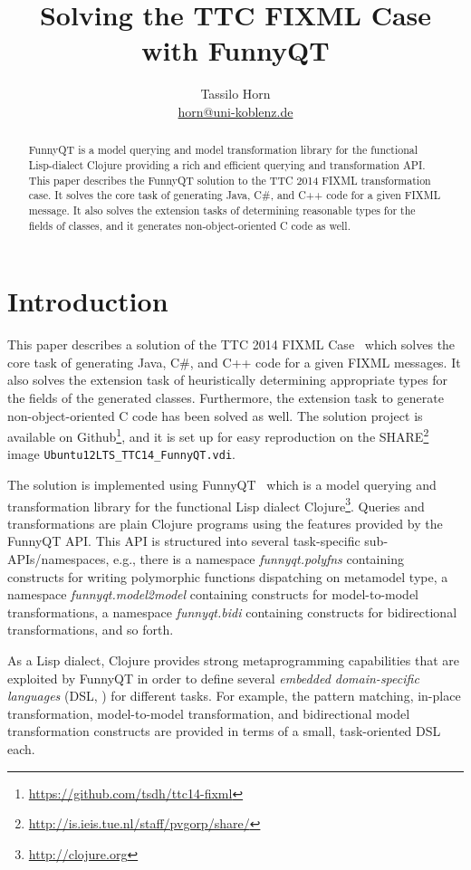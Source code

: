\documentclass[a4paper]{article}
\title{Solving the TTC FIXML Case with FunnyQT}
\author{Tassilo Horn\\
  \href{mailto:horn@uni-koblenz.de}{horn@uni-koblenz.de}}
\begin{document}
\maketitle

\begin{abstract}
  FunnyQT is a model querying and model transformation library for the
  functional Lisp-dialect Clojure providing a rich and efficient querying and
  transformation API.  This paper describes the FunnyQT solution to the TTC
  2014 FIXML transformation case.  It solves the core task of generating Java,
  C\#, and C++ code for a given FIXML message.  It also solves the extension
  tasks of determining reasonable types for the fields of classes, and it
  generates non-object-oriented C code as well.
\end{abstract}


\section{Introduction}
\label{sec:introduction}

This paper describes a solution of the TTC 2014 FIXML
Case~\cite{fixml-case-desc} which solves the core task of generating Java, C\#,
and C++ code for a given FIXML messages.  It also solves the extension task of
heuristically determining appropriate types for the fields of the generated
classes.  Furthermore, the extension task to generate non-object-oriented C
code has been solved as well.  The solution project is available on
Github\footnote{\url{https://github.com/tsdh/ttc14-fixml}}, and it is set up
for easy reproduction on the
SHARE\footnote{\url{http://is.ieis.tue.nl/staff/pvgorp/share/}} image
\texttt{Ubuntu12LTS\_TTC14\_FunnyQT.vdi}.

The solution is implemented using FunnyQT~\cite{Horn2013MQWFQ} which is a model
querying and transformation library for the functional Lisp dialect
Clojure\footnote{\url{http://clojure.org}}.  Queries and transformations are
plain Clojure programs using the features provided by the FunnyQT API.  This
API is structured into several task-specific sub-APIs/namespaces, e.g., there
is a namespace \emph{funnyqt.polyfns} containing constructs for writing
polymorphic functions dispatching on metamodel type, a namespace
\emph{funnyqt.model2model} containing constructs for model-to-model
transformations, a namespace \emph{funnyqt.bidi} containing constructs for
bidirectional transformations, and so forth.

As a Lisp dialect, Clojure provides strong metaprogramming capabilities that
are exploited by FunnyQT in order to define several \emph{embedded
  domain-specific languages} (DSL, \cite{book:Fowler2010DSL}) for different
tasks.  For example, the pattern matching, in-place transformation,
model-to-model transformation, and bidirectional model transformation
constructs are provided in terms of a small, task-oriented DSL each.
\end{document}
